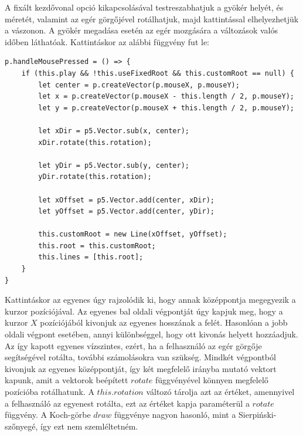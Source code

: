 A fixált kezdővonal opció kikapcsolásával testreszabhatjuk a gyökér helyét, és méretét, valamint az egér görgőjével rotálhatjuk, majd kattintással elhelyezhetjük a vászonon. A gyökér megadása esetén az egér mozgására a változások valós időben láthatóak. Kattintáskor az alábbi függvény fut le:
\begin{lstlisting}
p.handleMousePressed = () => {
	if (this.play && !this.useFixedRoot && this.customRoot == null) {
		let center = p.createVector(p.mouseX, p.mouseY);
		let x = p.createVector(p.mouseX - this.length / 2, p.mouseY);
		let y = p.createVector(p.mouseX + this.length / 2, p.mouseY);
		
		let xDir = p5.Vector.sub(x, center);
		xDir.rotate(this.rotation);
		
		let yDir = p5.Vector.sub(y, center);
		yDir.rotate(this.rotation);
		
		let xOffset = p5.Vector.add(center, xDir);
		let yOffset = p5.Vector.add(center, yDir);
		
		this.customRoot = new Line(xOffset, yOffset);
		this.root = this.customRoot;
		this.lines = [this.root];
	}
}
\end{lstlisting}
Kattintáskor az egyenes úgy rajzolódik ki, hogy annak középpontja megegyezik a kurzor pozíciójával. Az egyenes bal oldali végpontját úgy kapjuk meg, hogy a kurzor $X$ pozíciójából kivonjuk az egyenes hosszának a felét. Hasonlóan a jobb oldali végpont esetében, annyi különbséggel, hogy ott kivonás helyett hozzáadjuk. Az így kapott egyenes vízszintes, ezért, ha a felhasználó az egér görgője segítségével rotálta, további számolásokra van szükség. Mindkét végpontból kivonjuk az egyenes középpontját, így két megfelelő irányba mutató vektort kapunk, amit a vektorok beépített $rotate$ függvényével könnyen megfelelő pozícióba rotálhatunk. A $this.rotation$ változó tárolja azt az értéket, amennyivel a felhasználó az egyenest rotálta, ezt az értéket kapja paraméterül a $rotate$ függvény. A Koch-görbe $draw$ függvénye nagyon hasonló, mint a Sierpiński-szőnyegé, így ezt nem szemléltetném.
